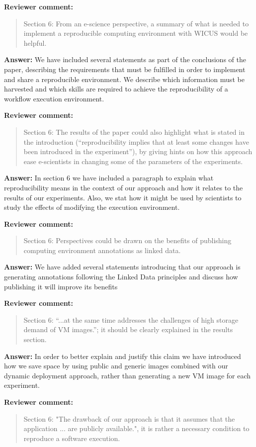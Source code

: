 \documentclass{letter}
\newenvironment{review}%
{\textbf{Reviewer comment:}\begin{quote}}%
{\end{quote}}%
\newcommand{\answer}[1]{%
      \textbf{Answer:} #1}
\begin{document}
\begin{letter}{}
\begin{review}
Section 6: From an e-science perspective, a summary of what is needed to implement a reproducible computing environment with WICUS would be helpful.
\end{review}

\answer{We have included several statements as part of the conclusions of the paper, describing the requirements that must be fulfilled in order to implement and share a reproducible environment. We describe which information must be harvested and which skills are required to achieve the reproducibility of a workflow execution environment.}


\begin{review}
Section 6: The results of the paper could also highlight what is stated in the introduction (``reproducibility implies that at least some changes have been introduced in the experiment''), by giving hints on how this approach ease e-scientists in changing some of the parameters of the experiments.
\end{review}

\answer{In section 6 we have included a paragraph to explain what reproducibility means in the context of our approach and how it relates to the results of our experiments. Also, we stat how it might be used by scientists to study the effects of modifying the execution environment.}


\begin{review}
Section 6: Perspectives could be drawn on the benefits of publishing computing environment annotations as linked data.
\end{review}

\answer{We have added several statements introducing that our approach is generating annotations following the Linked Data principles and discuss how publishing it will improve its benefits}

\begin{review}
Section 6: ``...at the same time addresses the challenges of high storage demand of VM images.''; it should be clearly explained in the results section.
\end{review}

\answer{In order to better explain and justify this claim we have introduced how we save space by using public and generic images combined with our dynamic deployment approach, rather than generating a new VM image for each experiment.}


\begin{review}
Section 6: "The drawback of our approach is that it assumes that the application ...  are publicly available.", it is rather a necessary condition to reproduce a software execution.
\end{review}


\end{letter}
\end{document}
